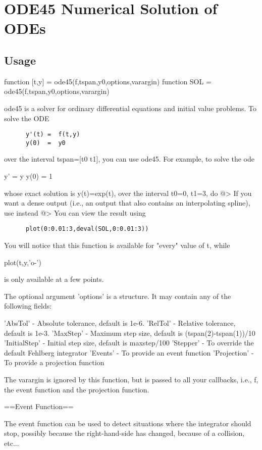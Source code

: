 \section{ODE45 Numerical Solution of ODEs}

\subsection{Usage}

 function [t,y] = ode45(f,tspan,y0,options,varargin)
 function SOL   = ode45(f,tspan,y0,options,varargin)

 ode45 is a solver for ordinary differential equations and initial value problems.
 To solve the ODE
\begin{verbatim}
      y'(t) =  f(t,y)
      y(0)  =  y0
\end{verbatim}
 over the interval tspan=[t0 t1], you can use ode45. For example, to solve
 the ode

      y'   =  y
      y(0) =  1

 whose exact solution is y(t)=exp(t), over the interval t0=0, t1=3, do
@>
 If you want a dense output (i.e., an output that also contains an interpolating
 spline), use instead
@>
 You can view the result using
\begin{verbatim}
      plot(0:0.01:3,deval(SOL,0:0.01:3))
\end{verbatim}
 You will notice that this function is available for "every" value of t, while

      plot(t,y,'o-')

 is only available at a few points.

 The optional argument 'options' is a structure. It may contain any of the
 following fields:

 'AbsTol'      - Absolute tolerance, default is 1e-6.
 'RelTol'      - Relative tolerance, default is 1e-3.
 'MaxStep'     - Maximum step size, default is (tspan(2)-tspan(1))/10
 'InitialStep' - Initial step size, default is maxstep/100
 'Stepper'     - To override the default Fehlberg integrator
 'Events'      - To provide an event function
 'Projection'  - To provide a projection function

 The varargin is ignored by this function, but is passed to all your callbacks, i.e.,
 f, the event function and the projection function.

 ==Event Function==

 The event function can be used to detect situations where the integrator should stop,
 possibly because the right-hand-side has changed, because of a collision, etc...

